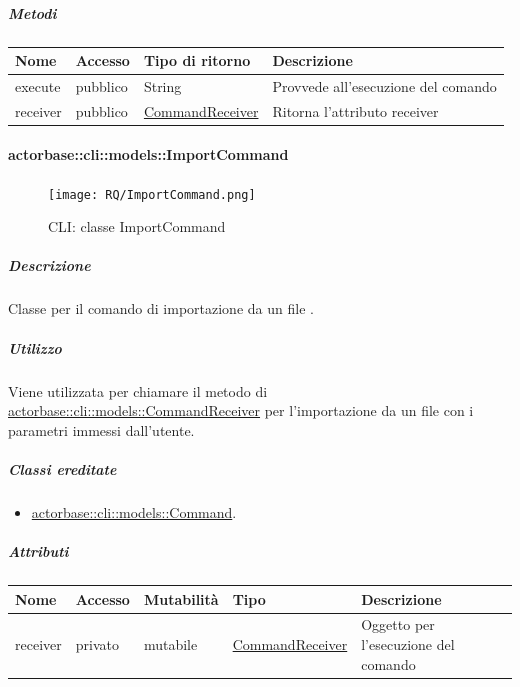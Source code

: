 \documentclass{scalatekids-article}
\begin{document}
\subparagraph{Metodi}

\begin{tabular}{| p{3cm} | p{1.5cm} | p{3.5cm} | p{9cm} |}
  \hline
  Nome & Accesso & Tipo di ritorno & Descrizione\\
  \hline
  execute & pubblico & String & Provvede all'esecuzione del comando\\
  \hline
  receiver & pubblico & \hyperref[sec:actorbase::cli::models::CommandReceiver]{CommandReceiver} & Ritorna l'attributo receiver\\
  \hline
\end{tabular}

\paragraph{actorbase::cli::models::ImportCommand}
\label{sec:actorbase::cli::models::ImportCommand}

\begin{figure}[H]
  \begin{center}
    \texttt{[image: RQ/ImportCommand.png]}
    \caption{CLI: classe ImportCommand}
  \end{center}
\end{figure}

\subparagraph{Descrizione}

Classe per il comando di importazione da un file .

\subparagraph{Utilizzo}

Viene utilizzata per chiamare il metodo di
\hyperref[sec:actorbase::cli::models::CommandReceiver]{actorbase::cli::models::CommandReceiver} per l'importazione da un file
 con i parametri immessi dall'utente.

\subparagraph{Classi ereditate}

\begin{itemize}
\item \hyperref[sec:actorbase::cli::models::Command]{actorbase::cli::models::Command}.
\end{itemize}

\subparagraph{Attributi}
\begin{tabular}{| p{1cm} | p{1.5cm} | p{2cm} | p{4cm} | p{8.5cm} |}
  \hline
  Nome & Accesso & Mutabilità & Tipo & Descrizione\\
  \hline
  receiver & privato & mutabile & \hyperref[sec:actorbase::cli::models::CommandReceiver]{CommandReceiver} & Oggetto per l'esecuzione del comando\\
  \hline
\end{tabular}
\end{document}
